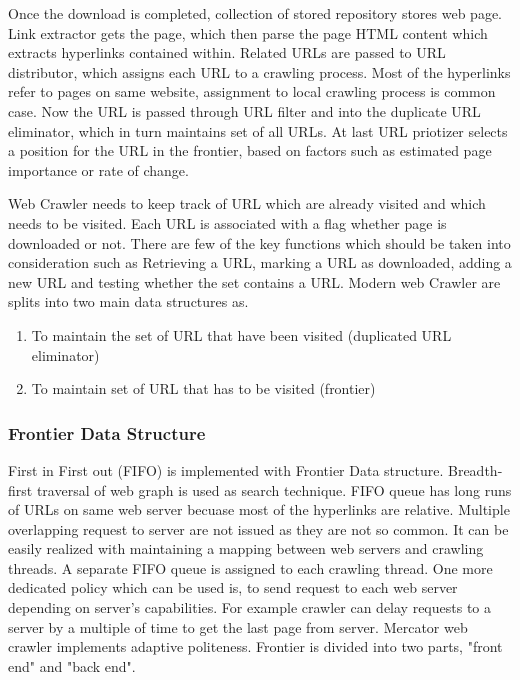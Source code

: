 \documentclass[article,type=msc,colorback,accentcolor=tud9c,twoside,11pt]{tudthesis}
\begin{document}
 Once the download is completed, collection of stored repository stores web page. Link extractor gets the page, which then parse the page HTML content which extracts hyperlinks contained within. Related URLs are passed to URL distributor, which assigns each URL to a crawling process. Most of the hyperlinks refer to pages on same website, assignment to local crawling process is common case. Now the URL is passed through URL filter and into the duplicate URL eliminator, which in turn maintains set of all URLs.  At last URL priotizer selects a position for the URL in the frontier, based on factors such as estimated page importance or rate of change.
 
Web Crawler needs to keep track of URL which are already visited and which needs to be visited. Each URL is associated with a flag whether page is downloaded or not. There are few of the key functions which should be taken into consideration such as Retrieving a URL, marking a URL as downloaded, adding a new URL and testing whether the set contains a URL. Modern web Crawler are splits into two main data structures as. 
 \begin{enumerate}
\item To maintain the set of URL that have been visited (duplicated URL eliminator)
\item To maintain set of URL that has to be visited (frontier)
\end{enumerate}

\subsubsection{Frontier Data Structure}
First in First out (FIFO) is implemented with  Frontier Data structure. Breadth-first traversal of web graph is used as search technique. FIFO queue has long runs of URLs on same web server becuase most of the  hyperlinks are relative. Multiple overlapping request to server are not issued as they are not so common. It can be easily realized with maintaining a mapping between web servers and crawling threads. A separate FIFO queue is assigned to each crawling thread. One more dedicated policy which can be used is, to send request to each web server depending on server's capabilities. For example crawler can delay requests to a server by a multiple of time to get the last page from server. Mercator web crawler implements adaptive politeness. Frontier is divided into two parts, "front end" and "back end".
\end{document}
